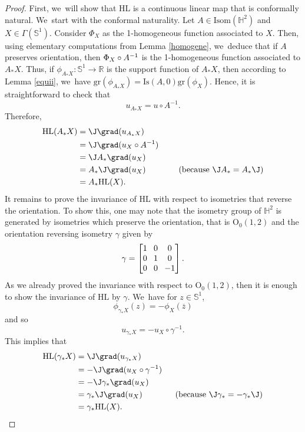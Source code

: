 \begin{proof}
First, we~will show that $\mathrm{HL}$ is a continuous linear map that is conformally natural. We~start with the conformal naturality. Let $A \in \mathrm{Isom}(\mathbb{H}^2)$ and $X \in \Gamma(\mathbb{S}^1)$. Consider $\Phi_X$ as the 1-homogeneous function associated to $X$. Then, using elementary computations from Lemma \ref{homogene}, we~deduce that if $A$ preserves orientation, then $\Phi_X \circ\nobreak A^{-1}$ is the 1-homogeneous function associated to $A_* X$. Thus, if $\phi_{A_* X}:\mathbb{S}^1 \to \mathbb{R}$ is the support function of $A_* X$, then according to Lemma \ref{equii}, we~have $\mathrm{gr}(\phi_{A_* X}) = \mathrm{Is}(A, 0) \mathrm{gr}(\phi_X)$. Hence, it is straightforward to check that
\[
u_{A_*X}=u\circ A^{-1}.
\]
Therefore,
\begin{align*}
\mathrm{HL}(A_*X)&=\J\grad(u_{A_*X})\\
&=\J\grad(u_X\circ A^{-1})\\
&=\J A_* \grad(u_X)\\
&=A_*\J\grad(u_X) \ \ \ \ \ \ \ \ \ \ \ \ (\text{because $\J A_*=A_*\J$})\\
&=A_*\mathrm{HL}(X).
\end{align*}
It remains to prove the invariance of $\mathrm{HL}$ with respect to isometries that reverse the orientation. To show this, one may note that the isometry group of $\mathbb{H}^2$ is generated by isometries which preserve the orientation, that is $\mathrm{O}_0(1,2)$ and the orientation reversing isometry $\gamma$ given by
\[\arraycolsep4pt
\gamma=\begin{bmatrix}
1 & 0 & 0 \\
0 & 1 & 0 \\
0 & 0 & -1
\end{bmatrix}.
\]
As we already proved the invariance with respect to $\mathrm{O}_0(1,2)$, then it is enough to show the invariance of $\mathrm{HL}$ by $\gamma$. We~have for $z \in \mathbb{S}^1$,
\[
\phi_{\gamma_*X}(z)=-\phi_X(\overline{z})
\]
and so
\[
u_{\gamma_*X}=-u_X\circ\gamma^{-1}.
\]
This implies that \begin{align*}
\mathrm{HL}(\gamma_*X)&=\J\grad(u_{\gamma_*X})\\
&=-\J\grad(u_X\circ \gamma^{-1})\\
&=-\J \gamma_* \grad(u_X)\\
&=\gamma_*\J\grad(u_X) \ \ \ \ \ \ \ \ \ \ \ \ (\text{because $\J \gamma_*=-\gamma_*\J$})\\
&=\gamma_*\mathrm{HL}(X).
\end{align*}

\end{proof}
